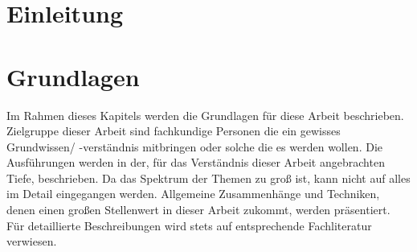 \documentclass[a4paper,12pt, twoside, openright]{scrbook}
\begin{document}
\frontmatter 




%

%


\tableofcontents 
%
\listoffigures
%
\listoftables
%
\lstlistoflistings
%

%


\mainmatter 




\renewcommand{\chaptermark}[1]{\markboth{\scshape{\thechapter.\ #1}}{ }}
\renewcommand{\sectionmark}[1]{ \markright{\scshape{\thesection.\  #1}}{} }

\chapter{Einleitung}
%

%
\chapter{Grundlagen}
Im Rahmen dieses Kapitels werden die Grundlagen für diese Arbeit beschrieben. 
Zielgruppe dieser Arbeit sind fachkundige Personen die ein gewisses Grundwissen/ -verständnis mitbringen oder solche die es werden wollen. Die Ausführungen werden in der, für das Verständnis dieser Arbeit angebrachten Tiefe, beschrieben. Da das Spektrum der Themen zu groß ist, kann nicht auf alles im Detail eingegangen werden. Allgemeine Zusammenhänge und Techniken, denen einen großen Stellenwert in dieser Arbeit zukommt, werden  präsentiert. Für detaillierte Beschreibungen wird stets auf entsprechende Fachliteratur verwiesen.\\
%
\end{document}
